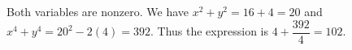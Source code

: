 Both variables are nonzero. We have $x^2+y^2=16+4=20$ and $x^4+y^4=20^2-2(4)=392$. Thus the expression is $4+\dfrac{392}{4}=\boxed{102}$.
